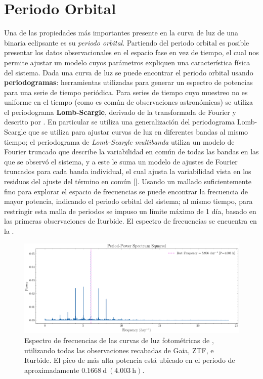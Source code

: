\chapter{Periodo Orbital} \label{metodologia:analisisperiodo}

Una de las propiedades más importantes presente en la curva de luz de una
binaria eclipsante es su \textit{periodo orbital}. Partiendo del periodo orbital
es posible presentar los datos observacionales en el espacio fase en vez de
tiempo, el cual nos permite ajustar un modelo cuyos parámetros expliquen una
característica física del sistema. Dada una curva de luz se puede encontrar el
periodo orbital usando \textbf{periodogramas}: herramientas utilizadas para
generar un espectro de potencias para una serie de tiempo periódica. Para series
de tiempo cuyo muestreo no es uniforme en el tiempo (como es común de
observaciones astronómicas) se utiliza el periodograma \textbf{Lomb-Scargle},
derivado de la transformada de Fourier y descrito por
. En
particular se utiliza una generalización del periodograma Lomb-Scargle que se
utiliza para ajustar curvas de luz en diferentes bandas al mismo tiempo; el
periodograma de \textit{Lomb-Scargle multibanda} utiliza un modelo de Fourier
truncado que describe la variabilidad en común de todas las bandas en las que se
observó el sistema, y a este le suma un modelo de ajustes de Fourier truncados
para cada banda individual, el cual ajusta la variabilidad vista en los residuos
del ajuste del término en común
[]. Usando un
mallado suficientemente fino para explorar el espacio de frecuencias se puede
encontrar la frecuencia de mayor potencia, indicando el periodo orbital del
sistema; al mismo tiempo, para restringir esta malla de periodos se impuso un
límite máximo de 1 día, basado en las primeras observaciones de Iturbide. El
espectro de frecuencias se encuentra en la . 

\begin{figure}[!ht]
	\centering
	\includegraphics[scale=0.45]{Metodologia/Secciones/AnalisisPeriodo/Figures/LS Power Spectrum.png}
	
	\caption{Espectro de frecuencias de las curvas de luz fotométricas de
	\atoObjIdNoSpace, utilizando todas las observaciones recabadas de Gaia, ZTF,
	e Iturbide. El pico de más alta potencia está ubicado en el periodo de
	aproximadamente $0.1668 \ \mathrm{d} \ (4.003 \ \mathrm{h})$.} 
	\label{periodogramaLSFrecs}
\end{figure}

